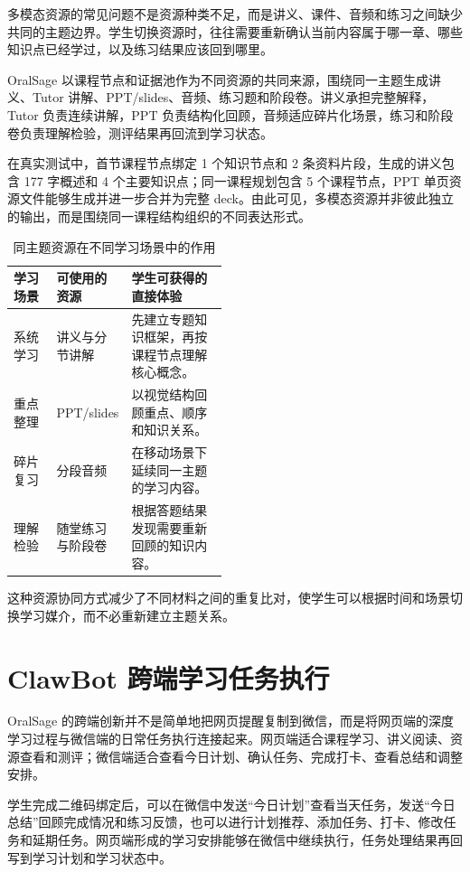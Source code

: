 多模态资源的常见问题不是资源种类不足，而是讲义、课件、音频和练习之间缺少共同的主题边界。学生切换资源时，往往需要重新确认当前内容属于哪一章、哪些知识点已经学过，以及练习结果应该回到哪里。

OralSage 以课程节点和证据池作为不同资源的共同来源，围绕同一主题生成讲义、Tutor 讲解、PPT/slides、音频、练习题和阶段卷。讲义承担完整解释，Tutor 负责连续讲解，PPT 负责结构化回顾，音频适应碎片化场景，练习和阶段卷负责理解检验，测评结果再回流到学习状态。

在真实测试中，首节课程节点绑定 1 个知识节点和 2 条资料片段，生成的讲义包含 177 字概述和 4 个主要知识点；同一课程规划包含 5 个课程节点，PPT 单页资源文件能够生成并进一步合并为完整 deck。由此可见，多模态资源并非彼此独立的输出，而是围绕同一课程结构组织的不同表达形式。

\begin{table}[H]
  \centering
  \caption{同主题资源在不同学习场景中的作用}
  \label{tab:innovation-resource-experience}
  \begin{tabularx}{\linewidth}{p{0.20\linewidth}p{0.27\linewidth}X}
    \toprule
    学习场景 & 可使用的资源 & 学生可获得的直接体验 \\
    \midrule
    系统学习 & 讲义与分节讲解 & 先建立专题知识框架，再按课程节点理解核心概念。 \\
    重点整理 & PPT/slides & 以视觉结构回顾重点、顺序和知识关系。 \\
    碎片复习 & 分段音频 & 在移动场景下延续同一主题的学习内容。 \\
    理解检验 & 随堂练习与阶段卷 & 根据答题结果发现需要重新回顾的知识内容。 \\
    \bottomrule
  \end{tabularx}
\end{table}

这种资源协同方式减少了不同材料之间的重复比对，使学生可以根据时间和场景切换学习媒介，而不必重新建立主题关系。

\section{ClawBot 跨端学习任务执行}

OralSage 的跨端创新并不是简单地把网页提醒复制到微信，而是将网页端的深度学习过程与微信端的日常任务执行连接起来。网页端适合课程学习、讲义阅读、资源查看和测评；微信端适合查看今日计划、确认任务、完成打卡、查看总结和调整安排。

学生完成二维码绑定后，可以在微信中发送“今日计划”查看当天任务，发送“今日总结”回顾完成情况和练习反馈，也可以进行计划推荐、添加任务、打卡、修改任务和延期任务。网页端形成的学习安排能够在微信中继续执行，任务处理结果再回写到学习计划和学习状态中。

